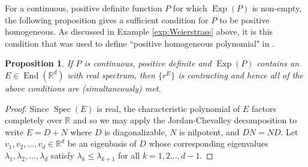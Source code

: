 \documentclass[11pt]{article}
\newtheorem{proposition}[theorem]{Proposition}
\theoremstyle{remark}
\newcommand\End{\operatorname{End}} %
\newcommand\Exp{\operatorname{Exp}}
\newcommand\Spec{\operatorname{Spec}}
\newcommand\R{\mathbb{R}}
\begin{document}
\noindent For a continuous, positive definite function $P$ for which $\Exp(P)$ is non-empty, the following proposition gives a sufficient condition for $P$ to be positive homogeneous. As discussed in Example \ref{exp:Weierstrass} above, it is this condition that was used to define ``positive homogeneous polynomial" in \cite{randles_convolution_2017}. 


\begin{proposition}\label{prop:PosHomSufficientCondition}
If $P$ is continuous, positive definite and $\Exp(P)$ contains an $E\in\End(\mathbb{R}^d)$ with real spectrum, then $\{r^E\}$ is contracting and hence all of the above conditions are (simultaneously) met. 
\end{proposition}
\begin{proof}
Since $\Spec(E)$ is real, the characteristic polynomial of $E$ factors completely over $\R$ and so we may apply the Jordan-Chevalley decomposition to write $E=D+N$ where $D$ is diagonalizable, $N$ is nilpotent, and $DN=ND$. Let $v_1,v_2,\dots,v_d \in \R^d$ be an eigenbasis of $D$ whose corresponding eigenvalues $\lambda_1,\lambda_2,\dots,\lambda_d$ satisfy $\lambda_k\leq \lambda_{k+1}$ for all $k=1,2\dots,d-1$.


\end{proof}
\end{document}
